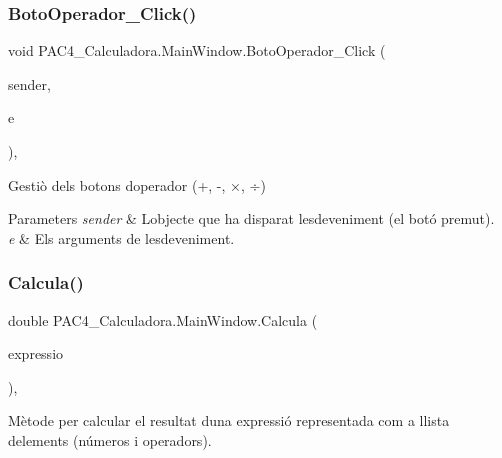 \subsubsection{\texorpdfstring{Boto\+Operador\+\_\+\+Click()}{BotoOperador\_Click()}}
{\footnotesize\ttfamily void P\+A\+C4\+\_\+\+Calculadora.\+Main\+Window.\+Boto\+Operador\+\_\+\+Click (\begin{DoxyParamCaption}\item[{object}]{sender,  }\item[{Routed\+Event\+Args}]{e }\end{DoxyParamCaption})\hspace{0.3cm}{\ttfamily [inline]}, {\ttfamily [private]}}



Gestiò dels botons d\textquotesingle{}operador (+, -\/, ×, ÷) 


\begin{DoxyParams}{Parameters}
{\em sender} & L\textquotesingle{}objecte que ha disparat l\textquotesingle{}esdeveniment (el botó premut).\\
\hline
{\em e} & Els arguments de l\textquotesingle{}esdeveniment.\\
\hline
\end{DoxyParams}
\mbox{\label{class_p_a_c4___calculadora_1_1_main_window_a30d4b4f2024024399de93f57e066e515}} 
\subsubsection{\texorpdfstring{Calcula()}{Calcula()}}
{\footnotesize\ttfamily double P\+A\+C4\+\_\+\+Calculadora.\+Main\+Window.\+Calcula (\begin{DoxyParamCaption}\item[{List$<$ string $>$}]{expressio }\end{DoxyParamCaption})\hspace{0.3cm}{\ttfamily [inline]}, {\ttfamily [private]}}



Mètode per calcular el resultat d\textquotesingle{}una expressió representada com a llista d\textquotesingle{}elements\textquotesingle{} (números i operadors). 


